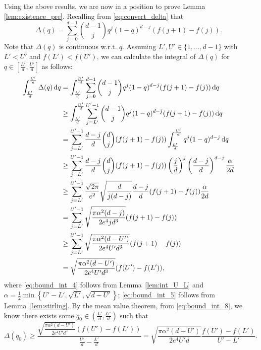 \documentclass[onecolumn,letterpaper]{IEEEtran}
\newcommand{\cp}{{q}}
\newcommand{\pgap}{{\Delta(\cp)}}
\newcommand{\up}{{U}}
\newcommand{\lw}{{L}}
\newcommand*{\dif}{{\,\mathrm{d}}}
\newcommand{\ap}{{\alpha}}
\newcommand{\cpns}{\cp_0}
\newcommand{\pgapns}{{\Delta(\cpns)}}
\begin{document}
Using the above results, we are now in a position to prove Lemma \ref{lem:existence_pre}.
Recalling from \eqref{eq:convert_delta} that
\begin{equation*}
\pgap = \sum\limits_{j=0}^{d-1} \binom{d-1}{j} \cp^j (1-\cp)^{d-j} (f(j+1) - f(j)).
\end{equation*}
Note that $\pgap$ is continuous w.r.t. $\cp$. Assuming $\lw', \up' \in\{1,\dots, d-1\}$ with $ \lw'<\up'$ and $f(\lw')<f(\up')$, we can calculate the integral of $\pgap$ for $\cp \in \left[ \frac{\lw'}{d} , \frac{\up'}{d} \right]$ as follows:
\begin{align}
\int_{\frac{\lw'}{d}}^{\frac{\up'}{d}} \pgap \dif q &= \int_{\frac{\lw'}{d}}^{\frac{\up'}{d}} \sum\limits_{j=0}^{d-1} \binom{d-1}{j} \cp^j (1-\cp)^{d-j} (f(j+1) - f(j)) \dif q \notag\\ 
&\ge \int_{\frac{\lw'}{d}}^{\frac{\up'}{d}} \sum\limits_{j=\lw'}^{\up'-1} \binom{d-1}{j} \cp^j (1-\cp)^{d-j} (f(j+1) - f(j)) \dif q \notag\\
&= \sum\limits_{j=\lw'}^{\up'-1} \frac{d-j}{d} \binom{d}{j} (f(j+1)-f(j)) \int_{\frac{\lw'}{d}}^{\frac{\up'}{d}} \cp^j (1-\cp)^{d-j} \dif q \notag\\ 
&\ge \sum\limits_{j=\lw'}^{\up'-1} \frac{d-j}{d} \binom{d}{j} (f(j+1)-f(j)) \left(\frac{j}{d}\right)^j \left(\frac{d-j}{d}\right)^{d-j} \frac{\ap}{2d} \label{eq:bound_int_4} \\ 
&\ge \sum\limits_{j=\lw'}^{\up'-1} \frac{\sqrt{2\pi}}{e^2} \sqrt{\frac{d}{j(d-j)}} \frac{d-j}{d} (f(j+1)-f(j)) \frac{\ap}{2d} \label{eq:bound_int_5}\\ 
&= \sum\limits_{j=\lw'}^{\up'-1} \sqrt{\frac{\pi \ap^2 (d-j)}{2e^4 j d^3}} (f(j+1)-f(j)) \notag\\ 
&\ge \sum\limits_{j=\lw'}^{\up'-1} \sqrt{\frac{\pi \ap^2 (d-\up')}{2e^4 \up' d^3}} (f(j+1)-f(j)) \notag\\ 
&= \sqrt{\frac{\pi \ap^2 (d-\up')}{2e^4 \up' d^3}} (f(\up')-f(\lw')), \label{eq:bound_int_8}
\end{align}
where \eqref{eq:bound_int_4} follows from Lemma~\ref{lem:int_U_L} and $\ap = \frac{1}{2} \min\left\{\up'-\lw' , \sqrt{\lw'} , \sqrt{d - \up'}\right\}$; \eqref{eq:bound_int_5} follows from Lemma~\ref{lem:stirling}.
By the mean value theorem, from \eqref{eq:bound_int_8}, we know there exists some $\cpns \in \left( \frac{\lw'}{d} , \frac{\up'}{d} \right)$ such that
\begin{equation*}
\pgapns \geq \frac{\sqrt{\frac{\pi \ap^2 (d-\up')}{2e^4 \up' d^3}} (f(\up')-f(\lw'))}{\frac {\up'} {d} - \frac {\lw'} {d}} = \sqrt{\frac{\pi \ap^2 (d-\up')}{2e^4 \up' d}} \frac{f(\up')-f(\lw')}{\up'-\lw'}.
\end{equation*}
\end{document}
